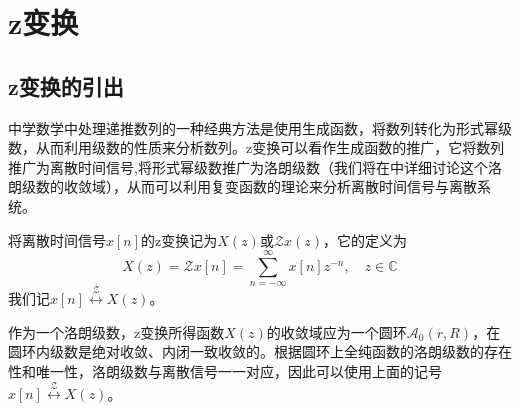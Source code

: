\section{z变换}\label{sec:z_Transform}

\subsection{z变换的引出}\label{sub:inteoduction_of_z}
中学数学中处理递推数列的一种经典方法是使用生成函数，将数列转化为形式幂级数，从而利用级数的性质来分析数列。z变换可以看作生成函数的推广，它将数列推广为离散时间信号,将形式幂级数推广为洛朗级数（我们将在中详细讨论这个洛朗级数的收敛域），从而可以利用复变函数的理论来分析离散时间信号与离散系统。
\begin{definition}[z变换]\label{def:z}
    将离散时间信号$x[n]$的z变换记为$X(z)$或$\mathcal{Z} x(z)$，它的定义为
    \[X(z)=\mathcal{Z} x[n]=\sum_{n=-\infty}^{\infty}x[n]z^{-n},\quad z\in\mathbb{C}\]
    我们记$x[n]\overset{\mathcal{Z} }{\longleftrightarrow}X(z)$。
\end{definition}
作为一个洛朗级数，z变换所得函数$X(z)$的收敛域应为一个圆环$\mathcal{A}_0(r,R)$，在圆环内级数是绝对收敛、内闭一致收敛的。根据圆环上全纯函数的洛朗级数的存在性和唯一性，洛朗级数与离散信号一一对应，因此可以使用上面的记号$x[n]\overset{\mathcal{Z} }{\longleftrightarrow}X(z)$。

